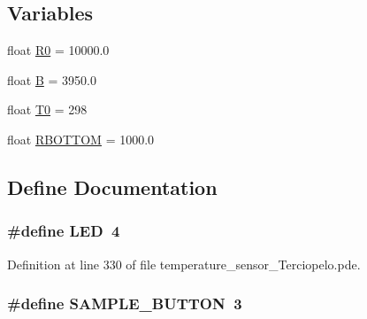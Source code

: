 \subsection*{Variables}
\begin{CompactItemize}
\item 
float \hyperlink{temperature__sensor___terciopelo_8pde_735577560ca40e5b6008a98829068904}{R0} = 10000.0
\item 
float \hyperlink{temperature__sensor___terciopelo_8pde_8188fea1f6709096fe21a3ee084d00d0}{B} = 3950.0
\item 
float \hyperlink{temperature__sensor___terciopelo_8pde_4211ba1269f650e21964d32238a460b2}{T0} = 298
\item 
float \hyperlink{temperature__sensor___terciopelo_8pde_d17df5990b551ac9e97a3d60f65833ff}{RBOTTOM} = 1000.0
\end{CompactItemize}


\subsection{Define Documentation}
\hypertarget{temperature__sensor___terciopelo_8pde_eb7a7ba1ab7e0406f1b5ab36d579f585}{
\subsubsection[{LED}]{\setlength{\rightskip}{0pt plus 5cm}\#define LED~4}}
\label{temperature__sensor___terciopelo_8pde_eb7a7ba1ab7e0406f1b5ab36d579f585}




Definition at line 330 of file temperature\_\-sensor\_\-Terciopelo.pde.\hypertarget{temperature__sensor___terciopelo_8pde_b2de299215608c2a35f0feb86adc2f6f}{
\subsubsection[{SAMPLE\_\-BUTTON}]{\setlength{\rightskip}{0pt plus 5cm}\#define SAMPLE\_\-BUTTON~3}}
\label{temperature__sensor___terciopelo_8pde_b2de299215608c2a35f0feb86adc2f6f}




